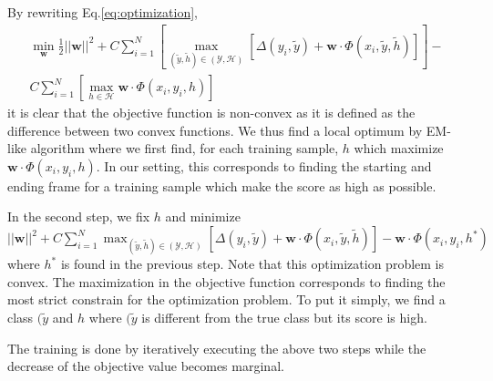 \documentclass[10pt,twocolumn,letterpaper]{article}
\begin{document}
By rewriting Eq.\ref{eq:optimization},
\begin{align*}\label{eq:optimization}
\min_{\mathbf{w}} \frac{1}{2} ||\mathbf{w} ||^2 + C \sum_{i=1}^{N} [ \max_{ (\tilde{y},\tilde{h}) \in (\mathcal{Y},\mathcal{H}) } [ \Delta(y_i, \tilde{y}) + \mathbf{w} \cdot \Phi(x_i, \tilde{y}, \tilde{h} )]] - \\
C \sum_{i=1}^{N} [ \max_{h \in \mathcal{H}}  \mathbf{w} \cdot \Phi(x_i,y_i, h)]
\end{align*}
it is clear that the objective function is non-convex as it is defined as the difference between two convex functions. We thus find a local optimum by EM-like algorithm where we first find, for each training sample, $h$ which maximize $\mathbf{w} \cdot \Phi(x_i,y_i, h)$. In our setting, this corresponds to finding the starting and ending frame for a training sample which make the score as high as possible.

In the second step, we fix $h$ and minimize $||\mathbf{w} ||^2 + C \sum_{i=1}^{N} \max_{ (\tilde{y},\tilde{h}) \in (\mathcal{Y},\mathcal{H}) } [ \Delta(y_i, \tilde{y}) + \mathbf{w} \cdot \Phi(x_i, \tilde{y}, \tilde{h} )] - \mathbf{w} \cdot \Phi(x_i,y_i,h^*)$ where $h^*$ is found in the previous step. Note that this optimization problem is convex. The maximization in the objective function corresponds to finding the most strict constrain for the optimization problem. To put it simply, we find a class $(\tilde{y}$ and $h$ where $(\tilde{y}$ is different from the true class but its score is high. 

The training is done by iteratively executing the above two steps while the decrease of the objective value becomes marginal. 

\end{document}
